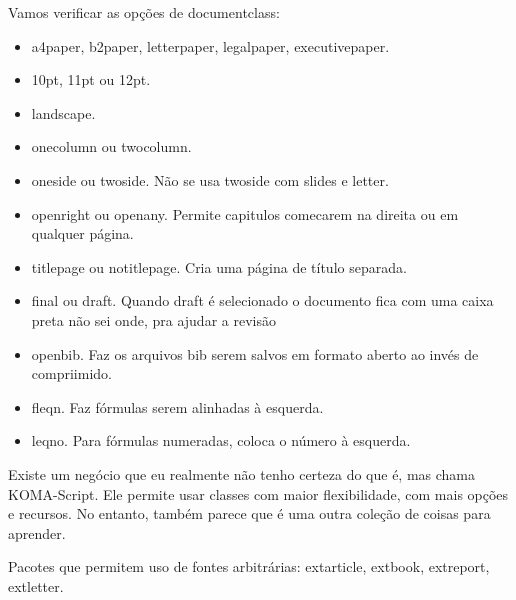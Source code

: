 Vamos verificar as opções de documentclass:
\begin{multicols}{2}
\begin{itemize}
    \item a4paper, b2paper, letterpaper, legalpaper, executivepaper.
    \item 10pt, 11pt ou 12pt. 
    \item landscape.
    \item onecolumn ou twocolumn.
    \item oneside ou twoside. Não se usa twoside com slides e letter.
    \item openright ou openany. Permite capitulos comecarem na direita ou em qualquer página.
    \item titlepage ou notitlepage. Cria uma página de título separada.
    \item final ou draft. Quando draft é selecionado o documento fica com uma caixa preta não sei onde, pra ajudar a revisão
    \item openbib. Faz os arquivos bib serem salvos em formato aberto ao invés de compriimido.
    \item fleqn. Faz fórmulas serem alinhadas à esquerda.
    \item leqno. Para fórmulas numeradas, coloca o número à esquerda.
\end{itemize}
\end{multicols}

Existe um negócio que eu realmente não tenho certeza do que é, mas chama KOMA-Script.
Ele permite usar classes com maior flexibilidade, com mais opções e recursos.
No entanto, também parece que é uma outra coleção de coisas para aprender.

Pacotes que permitem uso de fontes arbitrárias:
extarticle, extbook, extreport, extletter.


\newpage
